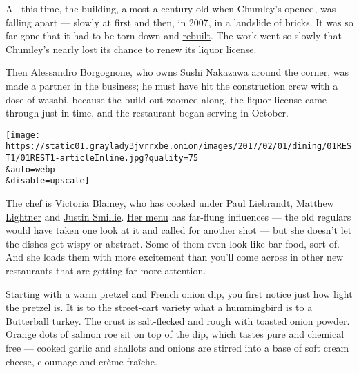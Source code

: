 All this time, the building, almost a century old when Chumley's opened,
was falling apart --- slowly at first and then, in 2007, in a landslide
of bricks. It was so far gone that it had to be torn down and
\href{http://www.nytimes3xbfgragh.onion/2013/01/01/nyregion/chumleys-ex-speakeasy-in-greenwich-village-seems-on-mend.html}{rebuilt}.
The work went so slowly that Chumley's nearly lost its chance to renew
its liquor license.

Then Alessandro Borgognone, who owns
\href{http://www.nytimes3xbfgragh.onion/2013/12/11/dining/reviews/restaurant-review-sushi-nakazawa-in-the-west-village.html}{Sushi
Nakazawa} around the corner, was made a partner in the business; he must
have hit the construction crew with a dose of wasabi, because the
build-out zoomed along, the liquor license came through just in time,
and the restaurant began serving in October.

\texttt{[image: https://static01.graylady3jvrrxbe.onion/images/2017/02/01/dining/01REST1/01REST1-articleInline.jpg?quality=75\\\&auto=webp\\\&disable=upscale]}

The chef is
\href{https://www.nytimes3xbfgragh.onion/2016/09/07/dining/chumleys-bar-restaurant.html}{Victoria
Blamey}, who has cooked under
\href{http://www.nytimes3xbfgragh.onion/2013/06/05/dining/paul-liebrandt-exacting-chef-set-to-open-the-elm-in-williamsburg.html}{Paul
Liebrandt},
\href{https://www.nytimes3xbfgragh.onion/2015/02/16/dining/matthew-lightner-will-leave-atera.html}{Matthew
Lightner} and
\href{https://www.nytimes3xbfgragh.onion/2015/01/14/dining/restaurant-review-upland-on-park-avenue-south.html?mtrref=www.google.com\&gwh=3DDE5EAB4BAB624808D2D2A0314C0F17\&gwt=pay}{Justin
Smillie}.
\href{http://chumleysnewyork.com/wp-content/uploads/2016/11/chumleys-drinks.pdf}{Her
menu} has far-flung influences --- the old regulars would have taken one
look at it and called for another shot --- but she doesn't let the
dishes get wispy or abstract. Some of them even look like bar food, sort
of. And she loads them with more excitement than you'll come across in
other new restaurants that are getting far more attention.

Starting with a warm pretzel and French onion dip, you first notice just
how light the pretzel is. It is to the street-cart variety what a
hummingbird is to a Butterball turkey. The crust is salt-flecked and
rough with toasted onion powder. Orange dots of salmon roe sit on top of
the dip, which tastes pure and chemical free --- cooked garlic and
shallots and onions are stirred into a base of soft cream cheese,
cloumage and crème fraîche.

